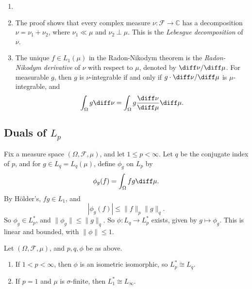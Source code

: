 \documentclass[12pt]{article}
\begin{document}
\begin{remark}
	\begin{enumerate}
		\item[]
		\item The proof shows that every complex measure $\nu : \mathcal{F} \to \mathbb{C}$ has a decomposition $\nu = \nu_1 + \nu_2$, where $\nu_1 \ll \mu$ and $\nu_2 \perp \mu$. This is the \emph{Lebesgue decomposition} of $\nu$.
		\item The unique $f \in L_1(\mu)$ in the Radon-Nikodym theorem is the \emph{Radon-Nikodym derivative} of $\nu$ with respect to $\mu$, denoted by $\diff \nu/ \diff \mu$. For measurable $g$, then $g$ is $\nu$-integrable if and only if $g \cdot \diff \nu/ \diff \mu$ is $\mu$-integrable, and
			\[
			\int_{\Omega} g \diff \nu = \int_{\Omega} g \frac{\diff \nu}{\diff \mu} \diff \mu.
			\]
	\end{enumerate}
\end{remark}

\subsection{Duals of \texorpdfstring{$L_p$}{Lp}}%
\label{sub:dlp}

Fix a measure space $(\Omega, \mathcal{F}, \mu)$, and let $1 \leq p < \infty$. Let $q$ be the conjugate index of $p$, and for $g \in L_q = L_q(\mu)$, define $\phi_g$ on $L_p$ by
\[
\phi_g(f) = \int_{\Omega} fg \diff \mu.
\]
By H\"older's, $fg \in L_1$, and
\[
|\phi_g(f)| \leq \|f\|_p \|g\|_q.
\]
So $\phi_g \in L_p^\ast$, and $\|\phi_g\| \leq \|g\|_q$. So $\phi : L_q \to L_p^\ast$ exists, given by $g \mapsto \phi_g$. This is linear and bounded, with $\|\phi\| \leq 1$.

\begin{theorem}
	Let $(\Omega, \mathcal{F}, \mu)$, and $p, q, \phi$ be as above.
	\begin{enumerate}[\normalfont(i)]
		\item If $1 < p < \infty$, then $\phi$ is an isometric isomorphic, so $L_p^\ast \cong L_q$.
		\item If $p = 1$ and $\mu$ is $\sigma$-finite, then $L_1^\ast \cong L_\infty$.
	\end{enumerate}	
\end{theorem}
\end{document}
